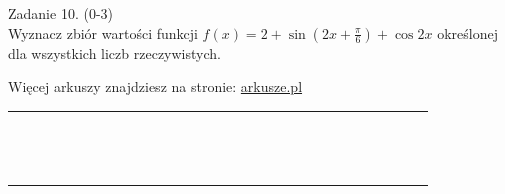 \documentclass[10pt]{article}
\begin{document}
Zadanie 10. (0-3)\\
Wyznacz zbiór wartości funkcji \(f(x)=2+\sin \left(2 x+\frac{\pi}{6}\right)+\cos 2 x\) określonej dla wszystkich liczb rzeczywistych.

Więcej arkuszy znajdziesz na stronie: \href{http://arkusze.pl}{arkusze.pl}

\begin{center}
\begin{tabular}{|c|c|c|c|c|c|c|c|c|c|c|c|c|c|c|c|c|c|c|c|c|c|c|c|c|c|c|c|c|c|}
\hline
 &  &  &  &  &  &  &  &  &  &  &  &  &  &  &  &  &  &  &  &  &  &  &  &  &  &  &  &  &  \\
\hline
 &  &  &  &  &  &  &  &  &  &  &  &  &  &  &  &  &  &  &  &  &  &  &  &  &  &  &  &  &  \\
\hline
 &  &  &  &  &  &  &  &  &  &  &  &  &  &  &  &  &  &  &  &  &  &  &  &  &  &  &  &  &  \\
\hline
 &  &  &  &  &  &  &  &  &  &  &  &  &  &  &  &  &  &  &  &  &  &  &  &  &  &  &  &  &  \\
\hline
 &  &  &  &  &  &  &  &  &  &  &  &  &  &  &  &  &  &  &  &  &  &  &  &  &  &  &  &  &  \\
\hline
 &  &  &  &  &  &  &  &  &  &  &  &  &  &  &  &  &  &  &  &  &  &  &  &  &  &  &  &  &  \\
\hline
 &  &  &  &  &  &  &  &  &  &  &  &  &  &  &  &  &  &  &  &  &  &  &  &  &  &  &  &  &  \\
\hline
 &  &  &  &  &  &  &  &  &  &  &  &  &  &  &  &  &  &  &  &  &  &  &  &  &  &  &  &  &  \\
\hline
 &  &  &  &  &  &  &  &  &  &  &  &  &  &  &  &  &  &  &  &  &  &  &  &  &  &  &  &  &  \\
\hline
 &  &  &  &  &  &  &  &  &  &  &  &  &  &  &  &  &  &  &  &  &  &  &  &  &  &  &  &  &  \\
\hline
 &  &  &  &  &  &  &  &  &  &  &  &  &  &  &  &  &  &  &  &  &  &  &  &  &  &  &  &  &  \\
\hline
 &  &  &  &  &  &  &  &  &  &  &  &  &  &  &  &  &  &  &  &  &  &  &  &  &  &  &  &  &  \\
\hline
 &  &  &  &  &  &  &  &  &  &  &  &  &  &  &  &  &  &  &  &  &  &  &  &  &  &  &  &  &  \\
\hline
 &  &  &  &  &  &  &  &  &  &  &  &  &  &  &  &  &  &  &  &  &  &  &  &  &  &  &  &  &  \\
\hline
 &  &  &  &  &  &  &  &  &  &  &  &  &  &  &  &  &  &  &  &  &  &  &  &  &  &  &  &  &  \\
\hline

\end{tabular}
\end{center}
\end{document}

